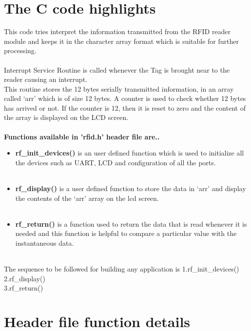 \documentclass[a4paper,29.6pt]{article}
\begin{document}
\section{The C code highlights}
\begin{small}
This code tries interpret the information transmitted from the RFID reader module and keeps it in the character array format which is suitable for further processing.\\\\
Interrupt Service Routine is called whenever the Tag is brought near to the reader causing an interrupt.\\
This routine stores the 12 bytes serially transmitted information, in an array called ‘arr’ which is of size 12 bytes. A counter is used to check whether 12 bytes has arrived or not. If the counter is 12, then it is reset to zero and the content of the array is displayed on the LCD screen.\\\\
\textbf{Functions available in 'rfid.h' header file are..}

\begin{itemize}
\item \textbf{rf\_init\_devices()} is  an user defined function which is used to initialize all the devices such as UART, LCD and configuration of all the ports.\\\\
\item \textbf{rf\_display()} is a user defined  function to store the data in ‘arr’ and display the contents of  the ‘arr’ array on the lcd screen.\\\\
\item \textbf{rf\_return()} is a function used to return the data that is read whenever it is needed and this function is helpful to compare a particular value with the instantaneous data.\\\\

\end{itemize}

The sequence to be followed for building any application is
1.rf\_init\_devices()\\
2.rf\_display()\\
3.rf\_return()\\

\end{small}
\section{Header file function details}
\end{document}

